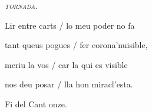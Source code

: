 \documentclass[12pt]{article}
\begin{document}
\begin{estrofaExtra}%




\begin{tornada}

\textit{\textsc{tornada.}}

\end{tornada}


\end{estrofaExtra}


\begin{estrofa}

 Lir entre carts / lo meu poder no fa

 tant queus pogues / fer corona'nuisible,

 meriu la vos / car la qui es visible

 nos deu posar / lla hon miracl'esta.

\end{estrofa}



\begin{estrofaExtra}%

\begin{final}

Fi del Cant onze.

\end{final}

\end{estrofaExtra}
\end{document}
